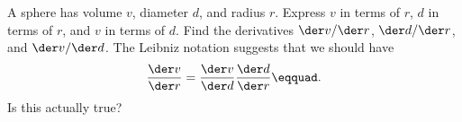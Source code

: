 A sphere has volume $v$, diameter $d$, and radius $r$.
Express $v$ in terms of $r$,
$d$ in terms of $r$, and
$v$ in terms of $d$.
Find the derivatives $\der v/\der r$, $\der d/\der r$, and $\der v/\der d$.
The Leibniz notation suggests that we should have
\begin{equation*}
  \frac{\der v}{\der r} = \frac{\der v}{\der d}  \frac{\der d}{\der r}\eqquad.
\end{equation*}
Is this actually true?
